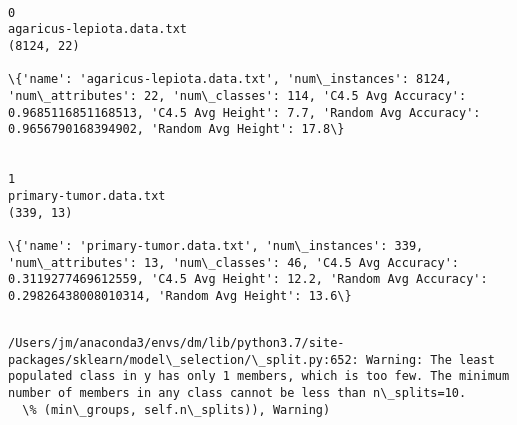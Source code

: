 \documentclass[11pt]{article}
\begin{document}
    \begin{Verbatim}[commandchars=\\\{\}]

0
agaricus-lepiota.data.txt
(8124, 22)

\{'name': 'agaricus-lepiota.data.txt', 'num\_instances': 8124, 'num\_attributes': 22, 'num\_classes': 114, 'C4.5 Avg Accuracy': 0.9685116851168513, 'C4.5 Avg Height': 7.7, 'Random Avg Accuracy': 0.9656790168394902, 'Random Avg Height': 17.8\}


1
primary-tumor.data.txt
(339, 13)

\{'name': 'primary-tumor.data.txt', 'num\_instances': 339, 'num\_attributes': 13, 'num\_classes': 46, 'C4.5 Avg Accuracy': 0.3119277469612559, 'C4.5 Avg Height': 12.2, 'Random Avg Accuracy': 0.29826438008010314, 'Random Avg Height': 13.6\}


    \end{Verbatim}

    \begin{Verbatim}[commandchars=\\\{\}]
/Users/jm/anaconda3/envs/dm/lib/python3.7/site-packages/sklearn/model\_selection/\_split.py:652: Warning: The least populated class in y has only 1 members, which is too few. The minimum number of members in any class cannot be less than n\_splits=10.
  \% (min\_groups, self.n\_splits)), Warning)

    \end{Verbatim}
\end{document}
